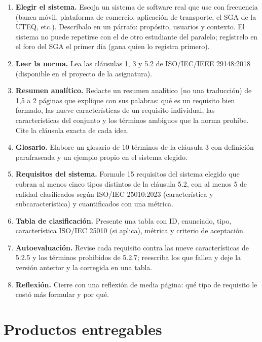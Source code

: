 \documentclass[11pt]{article}
\newcommand{\seccion}[1]{\section{\textcolor{utegreendk}{#1}}}
\begin{document}
\begin{enumerate}[leftmargin=20pt,itemsep=4pt]
	\item \textbf{Elegir el sistema.} Escoja un sistema de software real que use con frecuencia (banca móvil, plataforma de comercio, aplicación de transporte, el SGA de la UTEQ, etc.). Descríbalo en un párrafo: propósito, usuarios y contexto. El sistema no puede repetirse con el de otro estudiante del paralelo; regístrelo en el foro del SGA el primer día (gana quien lo registra primero).
	\item \textbf{Leer la norma.} Lea las cláusulas 1, 3 y 5.2 de ISO/\allowbreak{}IEC/\allowbreak{}IEEE 29148:2018 (disponible en el proyecto de la asignatura).
	\item \textbf{Resumen analítico.} Redacte un resumen analítico (no una traducción) de 1,5 a 2 páginas que explique con sus palabras: qué es un requisito bien formado, las nueve características de un requisito individual, las características del conjunto y los términos ambiguos que la norma prohíbe. Cite la cláusula exacta de cada idea.
	\item \textbf{Glosario.} Elabore un glosario de 10 términos de la cláusula 3 con definición parafraseada y un ejemplo propio en el sistema elegido.
	\item \textbf{Requisitos del sistema.} Formule 15 requisitos del sistema elegido que cubran al menos cinco tipos distintos de la cláusula 5.2, con al menos 5 de calidad clasificados según ISO/\allowbreak{}IEC 25010:2023 (característica y subcaracterística) y cuantificados con una métrica.
	\item \textbf{Tabla de clasificación.} Presente una tabla con ID, enunciado, tipo, característica ISO/\allowbreak{}IEC 25010 (si aplica), métrica y criterio de aceptación.
	\item \textbf{Autoevaluación.} Revise cada requisito contra las nueve características de 5.2.5 y los términos prohibidos de 5.2.7; reescriba los que fallen y deje la versión anterior y la corregida en una tabla.
	\item \textbf{Reflexión.} Cierre con una reflexión de media página: qué tipo de requisito le costó más formular y por qué.
\end{enumerate}

\seccion{Productos entregables}
\end{document}
